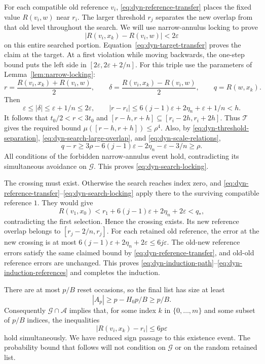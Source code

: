 For each compatible old reference $v_i$,
\eqref{eq:dyn-reference-transfer} places the fixed value $R(v_i,w)$
near $r_i$. The larger threshold $r_j$ separates the new overlap from
that old level throughout the search. We will use narrow-annulus
locking to prove
\begin{equation}\label{eq:dyn-search-locking}
 |R(v_i,x_k)-R(v_i,w)|<2\varepsilon
\end{equation}
on this entire searched portion. Equation~\eqref{eq:dyn-target-transfer} proves the claim at the target.
At a first violation while moving backwards, the one-step bound puts
the left side in $[2\varepsilon,2\varepsilon+2/n]$. For this triple
use the parameters of Lemma~\ref{lem:narrow-locking}:
\[
 r=\frac{R(v_i,x_k)+R(v_i,w)}2,\qquad
 \delta=\frac{R(v_i,x_k)-R(v_i,w)}2,\qquad q=R(w,x_k).
\]
Then
\[
 \varepsilon\leq|\delta|\leq\varepsilon+1/n\leq2\varepsilon,
 \qquad
 |r-r_i|\leq6(j-1)\varepsilon+2\eta_n+\varepsilon+1/n<h.
\]
It follows that $t_0/2<r<3t_0$ and
$[r-h,r+h]\subseteq[r_i-2h,r_i+2h]$. Thus $\mathcal T$ gives the
required bound $\mu([r-h,r+h])\leq\rho^4$. Also, by
\eqref{eq:dyn-threshold-separation},
\eqref{eq:dyn-search-large-overlap}, and
\eqref{eq:dyn-scale-relations},
\[
 q-r\geq3\rho-6(j-1)\varepsilon-2\eta_n-\varepsilon-3/n
       \geq\rho.
\]
All conditions of the forbidden narrow-annulus event hold, contradicting
its simultaneous avoidance on $\mathcal G$. This proves
\eqref{eq:dyn-search-locking}.

The crossing must exist. Otherwise the search reaches index zero, and
\eqref{eq:dyn-reference-transfer}--\eqref{eq:dyn-search-locking}
apply there to the surviving compatible reference $1$. They would give
\[
 R(v_1,x_0)<r_1+6(j-1)\varepsilon+2\eta_n+2\varepsilon<q_*,
\]
contradicting the first selection. Hence the crossing exists. Its new
reference overlap belongs to $[r_j-2/n,r_j]$. For each retained old
reference, the error at the new crossing is at most
$6(j-1)\varepsilon+2\eta_n+2\varepsilon\leq6j\varepsilon$.
The old-new reference errors satisfy the same claimed bound by
\eqref{eq:dyn-reference-transfer}, and old-old reference errors are
unchanged. This proves
\eqref{eq:dyn-induction-path}--\eqref{eq:dyn-induction-references} and
completes the induction.

There are at most $p/B$ reset occasions, so the final list has size at least
\begin{equation}\label{eq:dyn-retained-count}
 |A_p|\geq p-H_0p/B\geq p/B.
\end{equation}
Consequently $\mathcal G\cap\mathcal A$ implies that, for some
index $k$ in $\{0,\ldots,m\}$ and some subset of $p/B$
indices, the inequalities
\begin{equation}\label{eq:dyn-small-target-windows}
 |R(v_i,x_k)-r_i|\leq6p\varepsilon
\end{equation}
hold simultaneously. We have reduced sign passage to this existence event. The probability
bound that follows will not condition on $\mathcal G$ or on the
random retained list.

